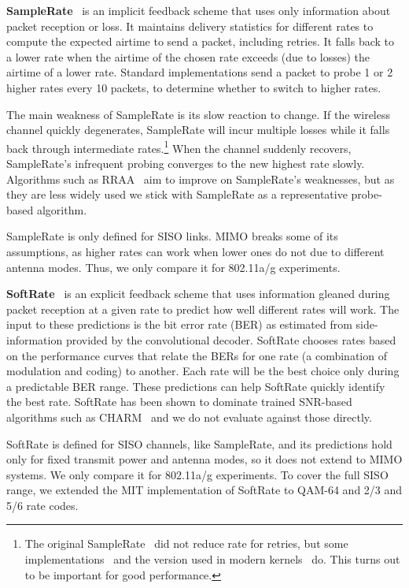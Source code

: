 \textbf{SampleRate}~\cite{Bicket_SampleRate} is an implicit feedback scheme that uses only information about packet reception or loss.
It maintains delivery statistics for different rates to compute the expected airtime to send a packet, including retries.
It falls back to a lower rate when the airtime of the chosen rate exceeds (due to losses) the airtime of a lower rate.
Standard implementations send a packet to probe 1 or 2 higher rates every 10 packets, to determine whether to switch to higher rates.

The main weakness of SampleRate is its slow reaction to change. If the wireless channel quickly degenerates, SampleRate will incur multiple losses while it falls back through intermediate rates.\footnote{The original SampleRate~\cite{Bicket_SampleRate} did not reduce rate for retries, but some implementations~\cite{Judd_CHARM} and the version used in modern kernels~\cite{Minstrel} do. This turns out to be important for good performance.} When the channel suddenly recovers, SampleRate's infrequent probing converges to the new highest rate slowly. Algorithms such as 
RRAA~\cite{Wong_RRAA} aim to improve on SampleRate's weaknesses, but as they are less widely used we stick with SampleRate as a representative probe-based algorithm.

SampleRate is only defined for SISO links. MIMO breaks some of its assumptions, as higher rates can work when lower ones do not due to different antenna modes. Thus, we only compare it for 802.11a/g experiments. 

\textbf{SoftRate}~\cite{Vutukuru_SoftRate} is an explicit feedback scheme that uses information gleaned during packet reception at a given rate to predict how well different rates will work. The input to these predictions is the bit error rate (BER) as estimated from side-information provided by the convolutional decoder. SoftRate chooses rates based on the performance curves that relate the BERs for one rate (a combination of modulation and coding) to another. %
Each rate will be the best choice only during a predictable BER range. These predictions can help SoftRate quickly identify the best rate. SoftRate has been shown to dominate trained SNR-based algorithms such as CHARM~\cite{Judd_CHARM} and we do not evaluate against those directly.


SoftRate is defined for SISO channels, like SampleRate, 
and its predictions hold only for fixed transmit power and antenna modes, so it does not extend to MIMO systems.
We only compare it for 802.11a/g experiments. 
To cover the full SISO range, we extended the MIT implementation of SoftRate to QAM-64 and 2/3 and 5/6 rate codes.

